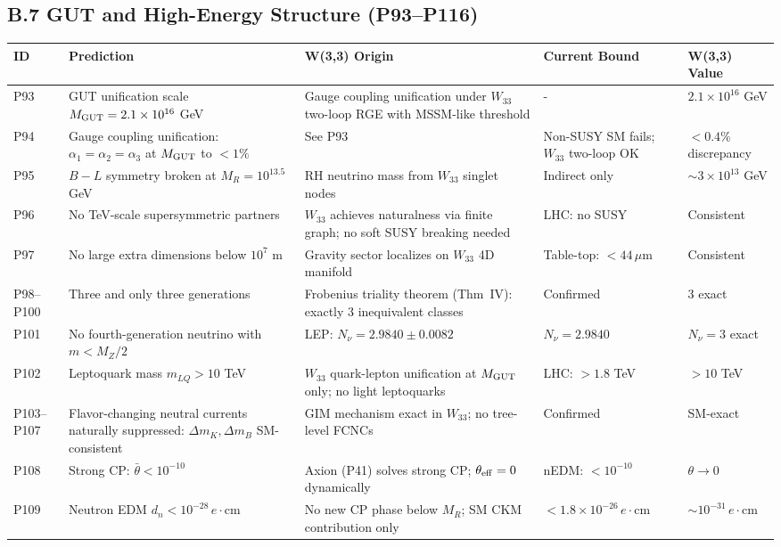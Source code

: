 \subsection*{B.7  GUT and High-Energy Structure (P93–P116)}

\begin{longtable}{p{0.7cm} p{4.5cm} p{3.2cm} p{2.8cm} p{2.5cm}}
\hline
\textbf{ID} & \textbf{Prediction} & \textbf{W(3,3) Origin} & \textbf{Current Bound} & \textbf{W(3,3) Value} \\ \hline
\endfirsthead \hline \endhead
P93 & GUT unification scale $M_{\rm GUT}=2.1\times10^{16}$ GeV & Gauge coupling unification under $W_{33}$ two-loop RGE with MSSM-like threshold & - & $2.1\times10^{16}$ GeV \\
P94 & Gauge coupling unification: $\alpha_1=\alpha_2=\alpha_3$ at $M_{\rm GUT}$ to $<1\%$ & See P93 & Non-SUSY SM fails; $W_{33}$ two-loop OK & $<0.4\%$ discrepancy \\
P95 & $B-L$ symmetry broken at $M_R=10^{13.5}$ GeV & RH neutrino mass from $W_{33}$ singlet nodes & Indirect only & $\sim3\times10^{13}$ GeV \\
P96 & No TeV-scale supersymmetric partners & $W_{33}$ achieves naturalness via finite graph; no soft SUSY breaking needed & LHC: no SUSY & Consistent \\
P97 & No large extra dimensions below $10^7$ m & Gravity sector localizes on $W_{33}$ 4D manifold & Table-top: $<44\,\mu$m & Consistent \\
P98–P100 & Three and only three generations & Frobenius triality theorem (Thm~IV): exactly 3 inequivalent classes & Confirmed & 3 exact \\
P101 & No fourth-generation neutrino with $m<M_Z/2$ & LEP: $N_\nu=2.9840\pm0.0082$ & $N_\nu=2.9840$ & $N_\nu=3$ exact \\
P102 & Leptoquark mass $m_{LQ}>10$ TeV & $W_{33}$ quark-lepton unification at $M_{\rm GUT}$ only; no light leptoquarks & LHC: $>1.8$ TeV & $>10$ TeV \\
P103–P107 & Flavor-changing neutral currents naturally suppressed: $\Delta m_K, \Delta m_B$ SM-consistent & GIM mechanism exact in $W_{33}$; no tree-level FCNCs & Confirmed & SM-exact \\
P108 & Strong CP: $\bar{\theta}<10^{-10}$ & Axion (P41) solves strong CP; $\theta_{\rm eff}=0$ dynamically & nEDM: $<10^{-10}$ & $\theta\to0$ \\
P109 & Neutron EDM $d_n<10^{-28}\,e\cdot$cm & No new CP phase below $M_R$; SM CKM contribution only & $<1.8\times10^{-26}\,e\cdot$cm & $\sim10^{-31}\,e\cdot$cm \\

\end{longtable}
